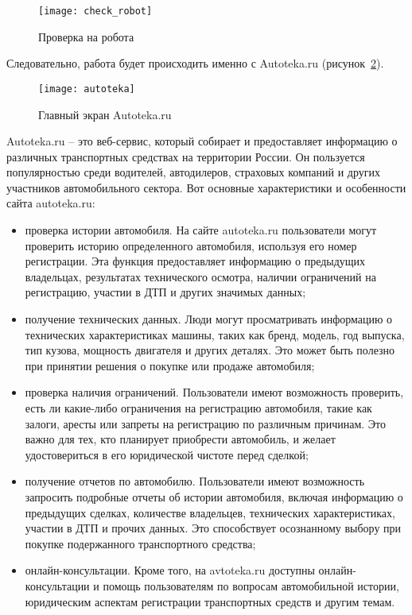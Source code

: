 \begin{figure}[ht]
	\centering
	\vspace{\toppaddingoffigure}
	\texttt{[image: check\_robot]}
	\caption{Проверка на робота}
	\label{f:check_robot}
\end{figure}


Следовательно, работа будет происходить именно с Autoteka.ru (рисунок~\ref{f:autoteka}).

\begin{figure}[ht]
	\centering
	\vspace{\toppaddingoffigure}
	\texttt{[image: autoteka]}
	\caption{Главный экран Autoteka.ru}
	\label{f:autoteka}
\end{figure}

Autoteka.ru – это веб-сервис, который собирает и предоставляет информацию о различных транспортных средствах на территории России. Он пользуется популярностью среди водителей, автодилеров, страховых компаний и других участников автомобильного сектора. Вот основные характеристики и особенности сайта autoteka.ru:

\begin{itemize}
    \item проверка истории автомобиля. На сайте autoteka.ru пользователи могут проверить историю определенного автомобиля, используя его номер регистрации. Эта функция предоставляет информацию о предыдущих владельцах, результатах технического осмотра, наличии ограничений на регистрацию, участии в ДТП и других значимых данных;
    \item получение технических данных. Люди могут просматривать информацию о технических характеристиках машины, таких как бренд, модель, год выпуска, тип кузова, мощность двигателя и других деталях. Это может быть полезно при принятии решения о покупке или продаже автомобиля;
    \item проверка наличия ограничений. Пользователи имеют возможность проверить, есть ли какие-либо ограничения на регистрацию автомобиля, такие как залоги, аресты или запреты на регистрацию по различным причинам. Это важно для тех, кто планирует приобрести автомобиль, и желает удостовериться в его юридической чистоте перед сделкой;
    \item получение отчетов по автомобилю. Пользователи имеют возможность запросить подробные отчеты об истории автомобиля, включая информацию о предыдущих сделках, количестве владельцев, технических характеристиках, участии в ДТП и прочих данных. Это способствует осознанному выбору при покупке подержанного транспортного средства;
    \item онлайн-консультации. Кроме того, на avtoteka.ru доступны онлайн-консультации и помощь пользователям по вопросам автомобильной истории, юридическим аспектам регистрации транспортных средств и другим темам.
\end{itemize}



